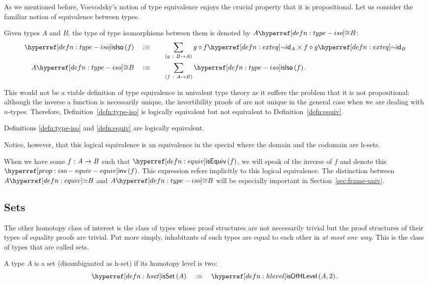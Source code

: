 As we mentioned before, Voevodsky's notion of type equivalence enjoys the crucial property
that it is propositional. Let us consider the familiar notion of equivalence between
types.
\begin{defn}\label{defn:type-iso}
  Given types $A$ and $B$, the type of type isomorphisms between them is denoted by
  $\typiso{A}{B}$:
  \begin{alignat*}{2}
    \istypiso{f}   \quad&\is\quad && \sigmaty{g}{B \rightarrow A}{\exteq{g \circ f}{\idfn{A}} \times \exteq{f \circ g}{\idfn{B}}} \\
    \typiso{A}{B} \quad&\is\quad &&\sigmaty{f}{A \rightarrow B}{\istypiso{f}}                          .
  \end{alignat*}
\end{defn}

This would not be a viable definition of type equivalence in univalent type theory as it
suffers the problem that it is not propositional: although the inverse a function is
necessarily unique, the invertibility proofs of are not unique in the general case when we
are dealing with $n$-types. Therefore, Definition~\ref{defn:type-iso} is logically
equivalent but not equivalent to Definition~\ref{defn:equiv}.

\begin{prop}\label{prop:iso-equiv-equiv}
  Definitions \ref{defn:type-iso} and \ref{defn:equiv} are logically equivalent.
\end{prop}


Notice, however, that this logical equivalence is an equivalence in the special where the
domain and the codomain are h-sets.

When we have some $f\hspace{0.1mm}:\hspace{0.1mm}A \rightarrow B$ such that $\isequiv{f}$, we will speak of the inverse
of $f$ and denote this $\invequiv{f}$. This expression refers implicitly to this logical
equivalence. The distinction between $\typequiv{A}{B}$ and $\typiso{A}{B}$ will be
especially important in Section~\ref{sec:frame-univ}.

\subsection{Sets}

The other homotopy class of interest is the class of types whose proof structures are not
necessarily trivial but the proof structures of their types of equality proofs are
trivial. Put more simply, inhabitants of such types are equal to each other in
\emph{at most one way}. This is the class of types that are called sets.
\begin{defn}[Set]\label{defn:hset}
  A type $A$ is a set (disambiguated as h-set) if its homotopy level is two:
  \begin{equation*}
    \isset{A} \quad\is\quad \isofhlevel{A}{2}.
  \end{equation*}
\end{defn}

